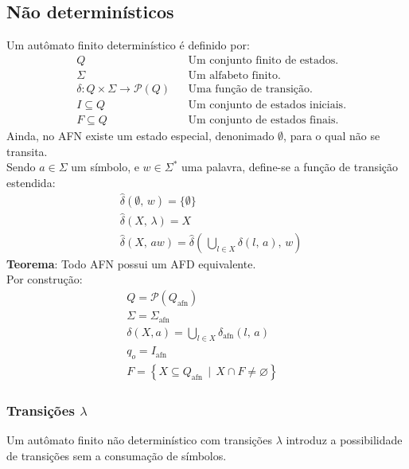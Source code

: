 \documentclass[11pt]{article}
\begin{document}
\subsection{Não determinísticos}
\label{sec:orgab42f1b}
Um autômato finito determinístico é definido por:
\begin{align*}
  & Q && \text{Um conjunto finito de estados.} \\
  & \Sigma && \text{Um alfabeto finito.} \\
  & \delta: Q \times \Sigma \to \mathcal{P}(Q) && \text{Uma função de transição.} \\
  & I \subseteq Q && \text{Um conjunto de estados iniciais.} \\
  & F \subseteq Q && \text{Um conjunto de estados finais.}
\end{align*}
Ainda, no AFN existe um estado especial, denonimado \(\emptyset\), para o qual não se
transita. \\
Sendo \(a \in \Sigma\) um símbolo, e \(w \in \Sigma^*\) uma palavra, define-se a função de
transição estendida:
\begin{align*}
  & \hat{\delta}(\emptyset,\, w) = \{\emptyset\} \\[5pt]
  & \hat{\delta}(X,\, \lambda) = X \\[5pt]
  & \hat{\delta}(X,\, aw) = \hat{\delta}\left(\,\bigcup_{l \in X} \delta(l,\, a),\, w \right)
\end{align*}
\textbf{Teorema}: Todo AFN possui um AFD equivalente. \\
Por construção:
\begin{align*}
  & Q = \mathcal{P}(Q_{\text{afn}}) && \\
  & \Sigma = \Sigma_{\text{afn}} && \\
  & \delta(X, a) = \bigcup_{l \in X} \delta_{\text{afn}}(l,\, a) && \\
  & q_o = I_{\text{afn}} && \\
  & F = \left\{ X \subseteq Q_{\text{afn}} \,\mid\, X \cap F \neq \varnothing \right\}&&
\end{align*}
\subsubsection{Transições \(\lambda\)}
\label{sec:org7dfc34f}
Um autômato finito não determinístico com transições \(\lambda\) introduz a
possibilidade de transições sem a consumação de símbolos.
\end{document}
